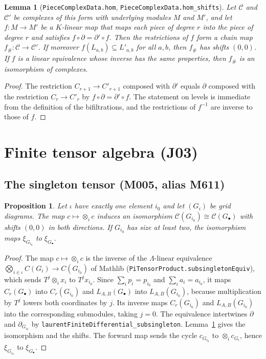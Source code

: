 \documentclass[11pt]{amsart}
\newtheorem{lemma}[theorem]{Lemma}
\newtheorem{proposition}[theorem]{Proposition}
\theoremstyle{definition}
\theoremstyle{remark}
\newcommand{\lean}[1]{\textnormal{\nolinkurl{#1}}}
\newcommand{\Lam}{\Lambda}
\newcommand{\cC}{\mathcal{C}}
\newcommand{\Lev}{L}
\begin{document}
\begin{lemma}[\lean{PieceComplexData.hom}, \lean{PieceComplexData.hom_shifts}]\label{lem:pieces}
Let $\cC$ and $\cC'$ be complexes of this form with underlying modules $M$ and $M'$, and let
$f\colon M\to M'$ be a $K$-linear map that maps each piece of degree $r$ into the piece of degree
$r$ and satisfies $f\circ\partial=\partial'\circ f$. Then the restrictions of $f$ form a chain map
$f_\#\colon\cC\to\cC'$. If moreover $f(\Lev_{a,b})\subseteq\Lev'_{a,b}$ for all $a,b$, then $f_\#$ has
shifts $(0,0)$. If $f$ is a linear equivalence whose inverse has the same properties, then $f_\#$
is an isomorphism of complexes.
\end{lemma}

\begin{proof}
The restriction $C_{r+1}\to C'_{r+1}$ composed with $\partial'$ equals $\partial$ composed with the
restriction $C_r\to C'_r$ by $f\circ\partial=\partial'\circ f$. The statement on levels is immediate
from the definition of the bifiltrations, and the restrictions of $f^{-1}$ are inverse to those of
$f$.
\end{proof}

\section{Finite tensor algebra (J03)}\label{sec:j03}

\subsection{The singleton tensor (M005, alias M611)}

\begin{proposition}\label{prop:singleton}
Let $\iota$ have exactly one element $i_0$ and let $(G_i)$ be grid diagrams. The map
$c\mapsto\otimes_i c$ induces an isomorphism $\cC(G_{i_0})\cong\cC(G_\bullet)$ with shifts $(0,0)$
in both directions. If $G_{i_0}$ has size at least two, the isomorphism maps $\xi_{G_{i_0}}$ to
$\xi_{G_\bullet}$.
\end{proposition}

\begin{proof}
The map $c\mapsto\otimes_ic$ is the inverse of the $\Lam$-linear equivalence
$\bigotimes_{i\in\iota}C(G_i)\to C(G_{i_0})$ of Mathlib (\lean{PiTensorProduct.subsingletonEquiv}),
which sends $T^j\otimes_ix_i$ to $T^jx_{i_0}$. Since $\sum_ip_i=p_{i_0}$ and
$\sum_ia_i=a_{i_0}$, it maps $C_r(G_\bullet)$ into $C_r(G_{i_0})$ and $\Lev_{A,B}(G_\bullet)$ into
$\Lev_{A,B}(G_{i_0})$, because multiplication by $T^j$ lowers both coordinates by $j$. Its inverse
maps $C_r(G_{i_0})$ and $\Lev_{A,B}(G_{i_0})$ into the corresponding submodules, taking $j=0$. The
equivalence intertwines $\partial$ and $\partial_{G_{i_0}}$ by
\lean{laurentFiniteDifferential_subsingleton}. Lemma~\ref{lem:pieces} gives the isomorphism and the
shifts. The forward map sends the cycle $c_{G_{i_0}}$ to $\otimes_ic_{G_i}$, hence
$\xi_{G_{i_0}}$ to $\xi_{G_\bullet}$.
\end{proof}
\end{document}
